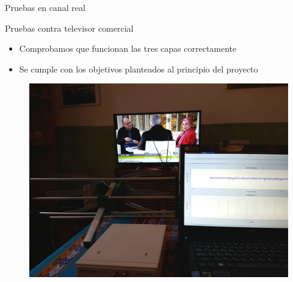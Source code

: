\begin{frame}{Pruebas en canal real}
\begin{block}{Pruebas contra televisor comercial}
	\begin{itemize}	
		\item { Comprobamos que funcionan las tres capas correctamente  }
		\item { Se cumple con los objetivos planteados al principio del proyecto }
	\end{itemize}
\end{block}

	\begin{figure}
	\includegraphics[scale=0.11]{contra_tele}
	\end{figure}

\end{frame}